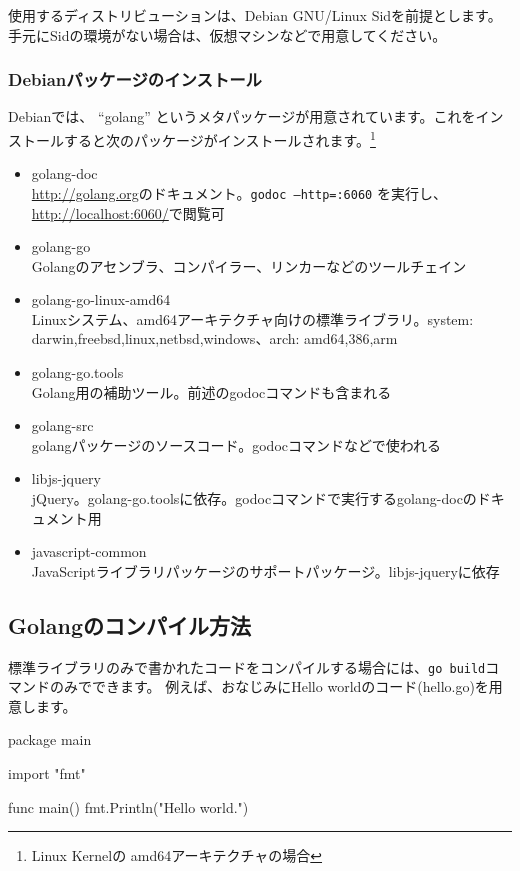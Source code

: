 \documentclass[mingoth,a4paper]{jsarticle}
\begin{document}
使用するディストリビューションは、Debian GNU/Linux Sidを前提とします。手元にSidの環境がない場合は、仮想マシンなどで用意してください。

\subsubsection{Debianパッケージのインストール}

Debianでは、 ``golang'' というメタパッケージが用意されています。これをインストールすると次のパッケージがインストールされます。\footnote{Linux Kernelの amd64アーキテクチャの場合}

\begin{itemize}
\item golang-doc \\
  \url{http://golang.org}のドキュメント。\texttt{godoc --http=:6060} を実行し、\url{http://localhost:6060/}で閲覧可
\item golang-go \\
  Golangのアセンブラ、コンパイラー、リンカーなどのツールチェイン
\item golang-go-linux-amd64 \\
  Linuxシステム、amd64アーキテクチャ向けの標準ライブラリ。system: darwin,freebsd,linux,netbsd,windows、arch: amd64,386,arm
\item golang-go.tools \\
  Golang用の補助ツール。前述のgodocコマンドも含まれる
\item golang-src \\
  golangパッケージのソースコード。godocコマンドなどで使われる
\item libjs-jquery \\
  jQuery。golang-go.toolsに依存。godocコマンドで実行するgolang-docのドキュメント用
\item javascript-common \\
  JavaScriptライブラリパッケージのサポートパッケージ。libjs-jqueryに依存
\end{itemize}

\subsection{Golangのコンパイル方法}

標準ライブラリのみで書かれたコードをコンパイルする場合には、\texttt{go build}コマンドのみでできます。
例えば、おなじみにHello worldのコード(hello.go)を用意します。

\begin{commandline}
package main

import "fmt"

func main() {
  fmt.Println("Hello world.")
}
\end{commandline}
\end{document}
